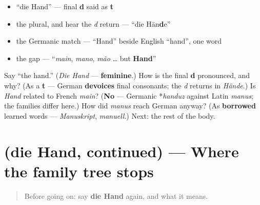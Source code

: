 \begin{itemize}
\raggedright
  \item \textquotedblleft{}die Hand\textquotedblright{} — final \textbf{d} said as \textbf{t}
  \item the plural, and hear the \emph{d} return — \textquotedblleft{}die Hän\textbf{d}e\textquotedblright{}
  \item the Germanic match — \textquotedblleft{}Hand\textquotedblright{} beside English \textquotedblleft{}hand\textquotedblright{}, one word
  \item the gap — \textquotedblleft{}\emph{main}, \emph{mano}, \emph{mão} … but \textbf{Hand}\textquotedblright{}
\end{itemize}

\begin{tcolorbox}[breakable,colback=teal!4,colframe=teal!35!black,title={Before you move on}]
Say \textquotedblleft{}the hand.\textquotedblright{} (\emph{Die Hand} — \textbf{feminine}.) How is the final \textbf{d} pronounced, and why? (As a \textbf{t} — German \textbf{devoices} final consonants; the \emph{d} returns in \emph{Hände}.) Is \emph{Hand} related to French \emph{main}? (\textbf{No} — Germanic *\emph{handuz} against Latin \emph{manus}; the families differ here.) How did \emph{manus} reach German anyway? (As \textbf{borrowed} learned words — \emph{Manuskript}, \emph{manuell}.) Next: the rest of the body.
\end{tcolorbox}
\section[(die Hand, continued)]{(die Hand, continued) — Where the family tree stops}

\label{lesson:GE-C17-hand-more}



\begin{quote}
Before going on: say \textbf{die Hand} again, and what it means.
\end{quote}

